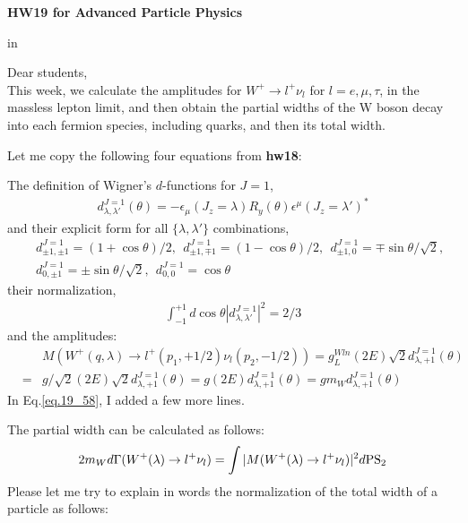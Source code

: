 \documentclass[12pt]{article}
\def\eps{\epsilon}
\def\lmd{\lambda}
\def\PS{\rm PS}
\begin{document}
\begin{center}
{\large\bf HW19 for Advanced Particle Physics} \\
  
\end{center}

 in

Dear students,\\
This week, we calculate the amplitudes for $W^+ \to l^+ \nu_l$ for
$l=e,\mu,\tau$, in the massless lepton limit, and then obtain the
partial widths of the W boson decay into each fermion species,
including quarks, and then its total width.

Let me copy the following four equations from {\bf hw18}:

The definition of Wigner's $d$-functions for $J=1$,
\begin{eqnarray}
  d^{J=1}_{\lmd,\lmd'}(\theta)
= - \eps_\mu(J_z=\lmd) R_y(\theta) \eps^\mu(J_z=\lmd')^* \label{eq.19_55}
\end{eqnarray}
and their explicit form for all $\{\lmd,\lmd'\}$ combinations,
\begin{eqnarray}\label{eq.19_56}
  &&d^{J=1}_{\pm1,\pm1} =  (1+\cos\theta)/2,~~
  d^{J=1}_{\pm1,\mp1} =  (1-\cos\theta)/2,~~
  d^{J=1}_{\pm1,   0} =  \mp \sin\theta/\sqrt2,~~\nonumber \\
  &&d^{J=1}_{   0,\pm1} =  \pm \sin\theta/\sqrt2,~~
  d^{J=1}_{   0,   0} =  \cos\theta
\end{eqnarray}
their normalization,
\begin{eqnarray}
  \int_{-1}^{+1} d\cos\theta |d^{J=1}_{\lmd,\lmd'}|^2 = 2/3 \label{eq.19_57}
\end{eqnarray}
and the amplitudes:
\begin{eqnarray}
  &&M(W^+(q,\lmd) \to l^+(p_1,+1/2) \nu_l(p_2,-1/2))
= g_L^{Wln} (2E) \sqrt{2}  d^{J=1}_{\lmd,+1}(\theta)\\
&=& g/\sqrt{2} (2E) \sqrt{2} d^{J=1}_{\lmd,+1}(\theta)
= g (2E)                   d^{J=1}_{\lmd,+1}(\theta) 
= g m_W                    d^{J=1}_{\lmd,+1}(\theta)\label{eq.19_58}
\end{eqnarray}
In Eq.\ref{eq.19_58}, I added a few more lines.

The partial width can be calculated as follows:
\begin{eqnarray}
  2m_W d\Gamma(W^+(\lmd) \to l^+ \nu_l)
= \int |M(W^+(\lmd) \to l^+ \nu_l)|^2 d\PS_2 \label{eq.19_59}
\end{eqnarray}
Please let me try to explain in words the normalization of the total
width of a particle as follows:
\end{document}
